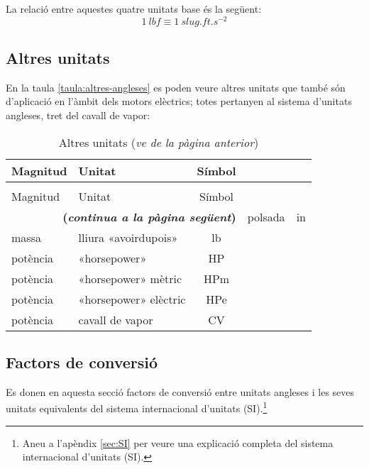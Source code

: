 La relació entre aquestes quatre unitats base és la següent:
\begin{equation}
    \SI{1}{lbf} \equiv \SI{1}{slug.ft.s^{-2}}
\end{equation}

\subsection{Altres unitats}

En la taula \vref{taula:altres-angleses} es poden veure altres unitats que també són d'aplicació en l'àmbit dels motors elèctrics; totes pertanyen al sistema d'unitats angleses, tret del cavall de vapor:
\begin{longtable}[h]{llc}
   \caption{\label{taula:altres-angleses}Altres unitats}\\
   \toprule[1pt]
    Magnitud & Unitat & Símbol \\
   \midrule
   \endfirsthead
   \caption[]{Altres unitats (\emph{ve de la pàgina anterior})}\\
   \toprule[1pt]
    Magnitud & Unitat & Símbol \\
   \midrule
   \endhead
   \midrule
   \multicolumn{3}{r}{\sffamily\bfseries\color{NavyBlue}(\emph{continua a la pàgina següent})}
   \endfoot
   \endlastfoot
   longitud & polsada & in \\
   massa & lliura «avoirdupois» & lb \\
   potència & «horsepower» & HP \\
   potència & «horsepower» mètric & \si{HPm} \\
   potència & «horsepower» elèctric & \si{HPe} \\
   potència & cavall de vapor & CV \\
   \bottomrule[1pt]
\end{longtable}


\subsection{Factors de conversió}

Es donen en aquesta secció factors de conversió entre unitats angleses i les seves unitats equivalents del sistema internacional d'unitats (SI).\footnote{Aneu a l'apèndix \ref{sec:SI} per veure una explicació completa del sistema internacional d'unitats (SI).}

